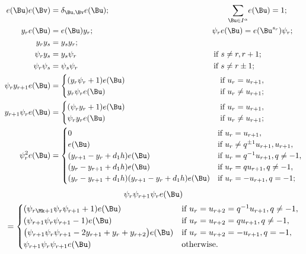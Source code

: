 \begin{align*}
e(\Bu) e(\Bv) &= \delta_{\Bu,\Bv} e(\Bu);
\hspace{53mm}{\sum_{\Bu \in I^\alpha}} e(\Bu) = 1;\\
y_r e(\Bu) &= e(\Bu) y_r;
\hspace{53mm}\psi_r e(\Bu) = e(\Bu^{s_r}) \psi_r;\\
y_r y_s &= y_s y_r;\\
\psi_r y_s &= y_s \psi_r\hspace{61.4mm}\text{if $s \neq r,r+1$};\\
\psi_r \psi_s &= \psi_s \psi_r\hspace{60.8mm}\text{if $s\neq r\pm 1$};\\
\psi_r y_{r+1} e(\Bu) 
&= 
\begin{cases}
 (y_r\psi_r+1)e(\Bu) &\hbox{if $u_r=u_{r+1}$},\\
 y_r\psi_r e(\Bu) \hspace{48mm}&\hbox{if $u_r\neq u_{r+1}$};
\end{cases}\\
y_{r+1} \psi_re(\Bu) &=
\begin{cases}
 (\psi_r y_r+1) e(\Bu)
 &\hbox{if $u_r=u_{r+1}$},\\
 \psi_r y_r e(\Bu) \hspace{48mm}&\hbox{if $u_r\neq u_{r+1}$};\\
\end{cases}\\
\psi_r^2e(\Bu) &=
\begin{cases}
0 \hspace{60mm}&\text{if $u_r = u_{r+1}$},\\
e(\Bu)&\text{if $u_r \neq q^{\pm 1}u_{r+1},u_{r+1}$},\\
(y_{r+1}-y_r+d_1h)e(\Bu)&\text{if $u_r = q^{-1}u_{r+1}, q\neq -1$},\\
(y_r - y_{r+1}+d_1h)e(\Bu)&\text{if $u_r = qu_{r+1}, q\neq -1$},\\
(y_r - y_{r+1}+d_1h)(y_{r+1} - y_{r}+d_1h) e(\Bu)&\text{if $u_r=-u_{r+1}, q=-1$};
\end{cases}
\end{align*}\begin{multline*}
\psi_{r}\psi_{r + 1} \psi_{r} e(\Bu)
\\
=
\begin{cases}
 (\psi_{r\Mk+ 1} \psi_{r} \psi_{r + 1}  + 1)e(\Bu)& \text{if $u_r  =  u_{r + 2} = q^{-1}u_{r + 1}, q \neq  -1$},\\
 (\psi_{r+1} \psi_{r} \psi_{r+1} -1)e(\Bu)& \text{if $u_r = u_{r+2}=qu_{r+1}, q\neq -1$},\\
 \big(\psi_{r+1} \psi_{r} \psi_{r+1} -2y_{r+1} +y_r+y_{r+2}\big)e(\Bu)
& \text{if $u_r = u_{r+2}=-u_{r+1}, q= -1$},\\
 \psi_{r+1} \psi_{r} \psi_{r+1} e(\Bu)& \text{otherwise}.
\end{cases}
\end{multline*}

